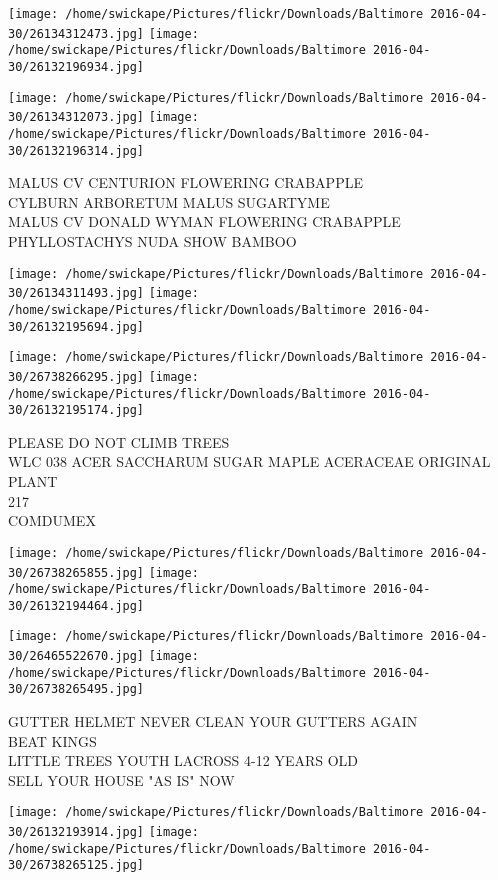 \documentclass[10pt,letterpaper]{article}
\begin{document}
\texttt{[image: /home/swickape/Pictures/flickr/Downloads/Baltimore 2016-04-30/26134312473.jpg]}
\texttt{[image: /home/swickape/Pictures/flickr/Downloads/Baltimore 2016-04-30/26132196934.jpg]}

\texttt{[image: /home/swickape/Pictures/flickr/Downloads/Baltimore 2016-04-30/26134312073.jpg]}
\texttt{[image: /home/swickape/Pictures/flickr/Downloads/Baltimore 2016-04-30/26132196314.jpg]}

MALUS CV CENTURION FLOWERING CRABAPPLE\\
CYLBURN ARBORETUM MALUS SUGARTYME\\
MALUS CV DONALD WYMAN FLOWERING CRABAPPLE\\
PHYLLOSTACHYS NUDA SHOW BAMBOO
\pagebreak

\texttt{[image: /home/swickape/Pictures/flickr/Downloads/Baltimore 2016-04-30/26134311493.jpg]}
\texttt{[image: /home/swickape/Pictures/flickr/Downloads/Baltimore 2016-04-30/26132195694.jpg]}

\texttt{[image: /home/swickape/Pictures/flickr/Downloads/Baltimore 2016-04-30/26738266295.jpg]}
\texttt{[image: /home/swickape/Pictures/flickr/Downloads/Baltimore 2016-04-30/26132195174.jpg]}

PLEASE DO NOT CLIMB TREES\\
WLC 038 ACER SACCHARUM SUGAR MAPLE ACERACEAE ORIGINAL PLANT\\
217\\
COMDUMEX
\pagebreak

\texttt{[image: /home/swickape/Pictures/flickr/Downloads/Baltimore 2016-04-30/26738265855.jpg]}
\texttt{[image: /home/swickape/Pictures/flickr/Downloads/Baltimore 2016-04-30/26132194464.jpg]}

\texttt{[image: /home/swickape/Pictures/flickr/Downloads/Baltimore 2016-04-30/26465522670.jpg]}
\texttt{[image: /home/swickape/Pictures/flickr/Downloads/Baltimore 2016-04-30/26738265495.jpg]}

GUTTER HELMET NEVER CLEAN YOUR GUTTERS AGAIN\\
BEAT KINGS\\
LITTLE TREES YOUTH LACROSS 4{-}12 YEARS OLD\\
SELL YOUR HOUSE "AS IS" NOW
\pagebreak

\texttt{[image: /home/swickape/Pictures/flickr/Downloads/Baltimore 2016-04-30/26132193914.jpg]}
\texttt{[image: /home/swickape/Pictures/flickr/Downloads/Baltimore 2016-04-30/26738265125.jpg]}
\end{document}
